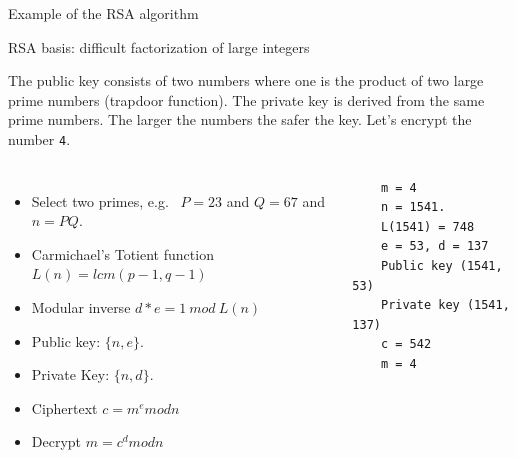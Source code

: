 \begin{frame}[t,fragile]{Example of the RSA algorithm}
  \begin{block}{ RSA basis: difficult factorization of large integers}
    {\footnotesize
      The public key consists of two numbers where one is the product of \alert{two large prime numbers} (trapdoor function). The private key is derived from the same prime numbers. The larger the numbers the safer the key. Let's encrypt the number \texttt{4}.
  \begin{columns}
      \begin{itemize}
      \item Select two primes, e.g.~ $P = 23$ and $Q = 67$ and $n=PQ$.
        \item Carmichael's Totient function $L(n) = lcm(p-1,q-1)$
        \item Modular inverse $d*e = 1~ mod~ L(n)$
        \item Public key: $\{n, e\}$.
        \item Private Key: $\{n, d\}$.
        \item Ciphertext $c = m^e mod n$
        \item Decrypt $m = c^d mod n$
        \end{itemize}
{\scriptsize
  \begin{lstlisting}
    m = 4
    n = 1541.
    L(1541) = 748
    e = 53, d = 137
    Public key (1541, 53)
    Private key (1541, 137)
    c = 542
    m = 4
  \end{lstlisting}
}
    \end{columns}
      
    }
  \end{block}
  
\end{frame}
